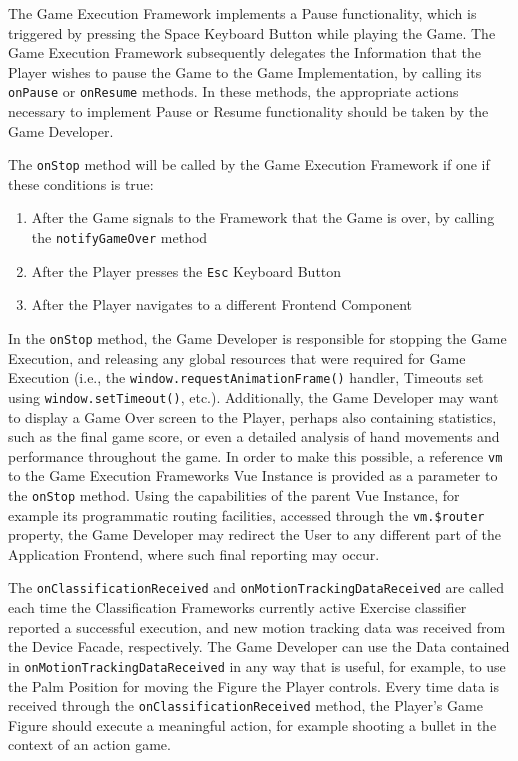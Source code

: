 The Game Execution Framework implements a Pause functionality, which is triggered by pressing the Space Keyboard Button while playing the Game. The Game Execution Framework subsequently delegates the Information that the Player wishes to pause the Game to the Game Implementation, by calling its \texttt{onPause} or \texttt{onResume} methods. In these methods, the appropriate actions necessary to implement Pause or Resume functionality should be taken by the Game Developer.

The \texttt{onStop} method will be called by the Game Execution Framework if one if these conditions is true:

\begin{enumerate}
   \item After the Game signals to the Framework that the Game is over, by calling the \texttt{notifyGameOver} method
   \item After the Player presses the \texttt{Esc} Keyboard Button
   \item After the Player navigates to a different Frontend Component 
\end{enumerate}

\noindent
In the \texttt{onStop} method, the Game Developer is responsible for stopping the Game Execution, and releasing any global resources that were required for Game Execution (i.e., the \texttt{window.requestAnimationFrame()} handler, Timeouts set using \texttt{window.setTimeout()}, etc.). Additionally, the Game Developer may want to display a Game Over screen to the Player, perhaps also containing statistics, such as the final game score, or even a detailed analysis of hand movements and performance throughout the game. In order to make this possible, a reference \texttt{vm} to the Game Execution Frameworks Vue Instance is provided as a parameter to the \texttt{onStop} method. Using the capabilities of the parent Vue Instance, for example its programmatic routing facilities, accessed through the \texttt{vm.\$router} property, the Game Developer may redirect the User to any different part of the Application Frontend, where such final reporting may occur.

The \texttt{onClassificationReceived} and \texttt{onMotionTrackingDataReceived} are called each time the Classification Frameworks currently active Exercise classifier reported a successful execution, and new motion tracking data was received from the Device Facade, respectively. The Game Developer can use the Data contained in \texttt{onMotionTrackingDataReceived} in any way that is useful, for example, to use the Palm Position for moving the Figure the Player controls. Every time data is received through the \texttt{onClassificationReceived} method, the Player's Game Figure should execute a meaningful action, for example shooting a bullet in the context of an action game.

